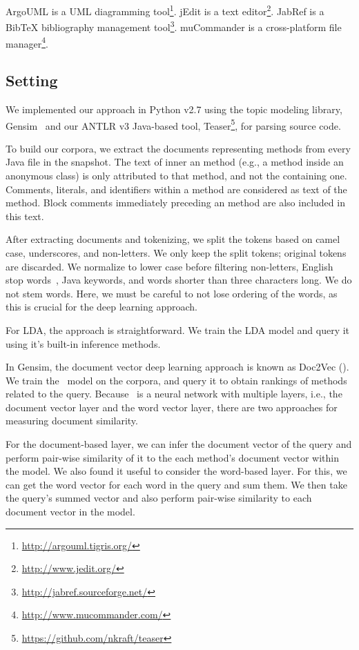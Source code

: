 ArgoUML is a UML diagramming tool\footnote{\url{http://argouml.tigris.org/}}.
jEdit is a text editor\footnote{\url{http://www.jedit.org/}}.
JabRef is a BibTeX bibliography management tool\footnote{\url{http://jabref.sourceforge.net/}}.
muCommander is a cross-platform file manager\footnote{\url{http://www.mucommander.com/}}.

\subsection{Setting}

We implemented our approach in Python v2.7 using the topic modeling library,
Gensim~\cite{Rehurek-Sojk_2010} and our ANTLR v3 Java-based tool,
Teaser\footnote{\url{https://github.com/nkraft/teaser}}, for parsing source
code.

To build our corpora, we extract the documents representing methods from every
Java file in the snapshot.  The text of inner an method (e.g., a method inside
an anonymous class) is only attributed to that method, and not the containing
one.  Comments, literals, and identifiers within a method are considered as text
of the method.  Block comments immediately preceding an method are also included
in this text.

After extracting documents and tokenizing, we split the tokens based on camel
case, underscores, and non-letters.  We only keep the split tokens; original
tokens are discarded.  We normalize to lower case before filtering non-letters,
English stop words~\cite{Fox_1992}, Java keywords, and words shorter than three
characters long.  We do not stem words. Here, we must be careful to not lose
ordering of the words, as this is crucial for the deep learning approach.

For LDA, the approach is straightforward. We train the LDA model and query it
using it's built-in inference methods.

In Gensim, the document vector deep learning approach is known as Doc2Vec (\dv).
We train the \dv\ model on the corpora, and query it to obtain rankings of
methods related to the query. Because \dv\ is a neural network with multiple
layers, i.e., the document vector layer and the word vector layer, there are two
approaches for measuring document similarity.

For the document-based layer, we can infer the document vector of the query and
perform pair-wise similarity of it to the each method's document vector within
the model.  We also found it useful to consider the word-based layer. For this,
we can get the word vector for each word in the query and sum them. We then take
the query's summed vector and also perform pair-wise similarity to each document
vector in the model.

